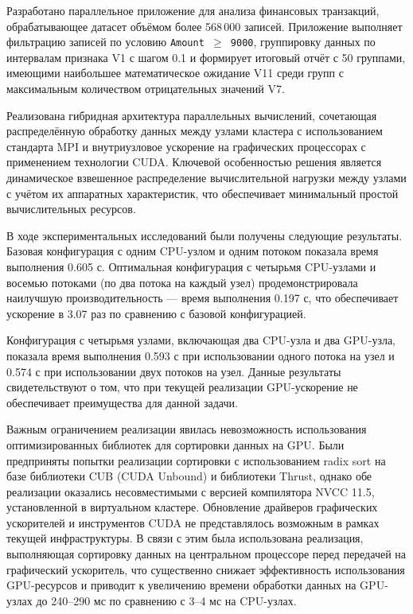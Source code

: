 \documentclass[areaset=advanced]{scrartcl}
\begin{document}
Разработано параллельное приложение для анализа финансовых транзакций, обрабатывающее датасет объёмом более 568\,000 записей. Приложение выполняет фильтрацию записей по условию \texttt{Amount $\geq$ 9000}, группировку данных по интервалам признака V1 с шагом 0.1 и формирует итоговый отчёт с 50 группами, имеющими наибольшее математическое ожидание V11 среди групп с максимальным количеством отрицательных значений V7.

Реализована гибридная архитектура параллельных вычислений, сочетающая распределённую обработку данных между узлами кластера с использованием стандарта MPI и внутриузловое ускорение на графических процессорах с применением технологии CUDA. Ключевой особенностью решения является динамическое взвешенное распределение вычислительной нагрузки между узлами с учётом их аппаратных характеристик, что обеспечивает минимальный простой вычислительных ресурсов.

В ходе экспериментальных исследований были получены следующие результаты. Базовая конфигурация с одним CPU-узлом и одним потоком показала время выполнения 0.605 с. Оптимальная конфигурация с четырьмя CPU-узлами и восемью потоками (по два потока на каждый узел) продемонстрировала наилучшую производительность — время выполнения 0.197 с, что обеспечивает ускорение в 3.07 раз по сравнению с базовой конфигурацией.

Конфигурация с четырьмя узлами, включающая два CPU-узла и два GPU-узла, показала время выполнения 0.593 с при использовании одного потока на узел и 0.574 с при использовании двух потоков на узел. Данные результаты свидетельствуют о том, что при текущей реализации GPU-ускорение не обеспечивает преимущества для данной задачи.

Важным ограничением реализации явилась невозможность использования оптимизированных библиотек для сортировки данных на GPU. Были предприняты попытки реализации сортировки с использованием radix sort на базе библиотеки CUB (CUDA Unbound) и библиотеки Thrust, однако обе реализации оказались несовместимыми с версией компилятора NVCC 11.5, установленной в виртуальном кластере. Обновление драйверов графических ускорителей и инструментов CUDA не представлялось возможным в рамках текущей инфраструктуры. В связи с этим была использована реализация, выполняющая сортировку данных на центральном процессоре перед передачей на графический ускоритель, что существенно снижает эффективность использования GPU-ресурсов и приводит к увеличению времени обработки данных на GPU-узлах до 240–290 мс по сравнению с 3–4 мс на CPU-узлах.
\end{document}
